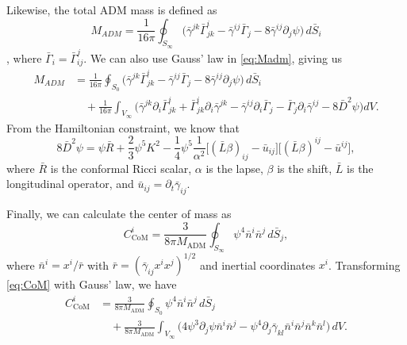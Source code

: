 \documentclass{../document}
\begin{document}
    Likewise, the total ADM mass is defined as
    \begin{equation} \label{eq:Madm}
      M_{ADM}
      = \frac{1}{16\pi} \oint_{S_\infty}  \Big(
        \bar\gamma^{jk} \bar\Gamma^i_{jk}
        - \bar\gamma^{ij} \bar\Gamma_{j}
        - 8 \bar\gamma^{ij} \partial_j \psi
        \Big) \, d\bar{S}_i
    \end{equation}
    \cite{BaumgarteShapiro}, where $\bar\Gamma_{i} = \bar\Gamma^j_{ij}$. We can also use Gauss' law in \eqref{eq:Madm}, giving us
    \begin{equation} \label{eq:Madm-volume}
      \begin{aligned}
        M_{ADM}
        &= \frac{1}{16\pi} \oint_{S_0}  \Big(
          \bar\gamma^{jk} \bar\Gamma^i_{jk}
          - \bar\gamma^{ij} \bar\Gamma_{j}
          - 8 \bar\gamma^{ij} \partial_j \psi
          \Big) \, d\bar{S}_i \\
        &\quad + \frac{1}{16\pi} \int_{V_\infty} \Big(
          \bar\gamma^{jk} \partial_i \bar\Gamma^i_{jk}
          + \bar\Gamma^i_{jk} \partial_i \bar\gamma^{jk}
          - \bar\gamma^{ij} \partial_i \bar\Gamma_j
          - \bar\Gamma_j \partial_i \bar\gamma^{ij}
          - 8 \bar D^2 \psi \Big) dV.
      \end{aligned}
    \end{equation}
    From the Hamiltonian constraint, we know that
    \begin{equation}
      8 \bar D^2 \psi = \psi \bar R + \frac{2}{3} \psi^5 K^2 - \frac{1}{4} \psi^5 \frac{1}{\alpha^2} \Big[ (\bar L \beta)_{ij} - \bar u_{ij} \Big] \Big[ (\bar L \beta)^{ij} - \bar u^{ij} \Big],
    \end{equation}
    where $\bar R$ is the conformal Ricci scalar, $\alpha$ is the lapse, $\beta$ is the shift, $\bar L$ is the longitudinal operator, and $\bar u_{ij} = \partial_t \bar\gamma_{ij}$.

    Finally, we can calculate the center of mass as
    \begin{equation} \label{eq:CoM}
      C_\text{CoM}^i = \frac{3}{8 \pi M_\text{ADM}} \oint_{S_\infty} \psi^4 \bar n^i \bar n^j \, d\bar{S}_j,
    \end{equation}
    where $\bar n^i = x^i / \bar r$ with $\bar r = (\bar\gamma_{ij} x^i x^j)^{1/2}$ and inertial coordinates $x^i$. Transforming \eqref{eq:CoM} with Gauss' law, we have
    \begin{equation} \label{eq:CoM-volume}
      \begin{aligned}
        C_\text{CoM}^i
        &= \frac{3}{8 \pi M_\text{ADM}} \oint_{S_0} \psi^4 \bar n^i \bar n^j \, d\bar{S}_j \\
        &\quad + \frac{3}{8 \pi M_\text{ADM}} \int_{V_\infty} \Big( 4 \psi^3 \partial_j \psi \bar n^i \bar n^j - \psi^4 \partial_j \bar\gamma_{kl} \bar n^i \bar n^j \bar n^k \bar n^l \Big) \, dV.
      \end{aligned}
    \end{equation}
\end{document}
